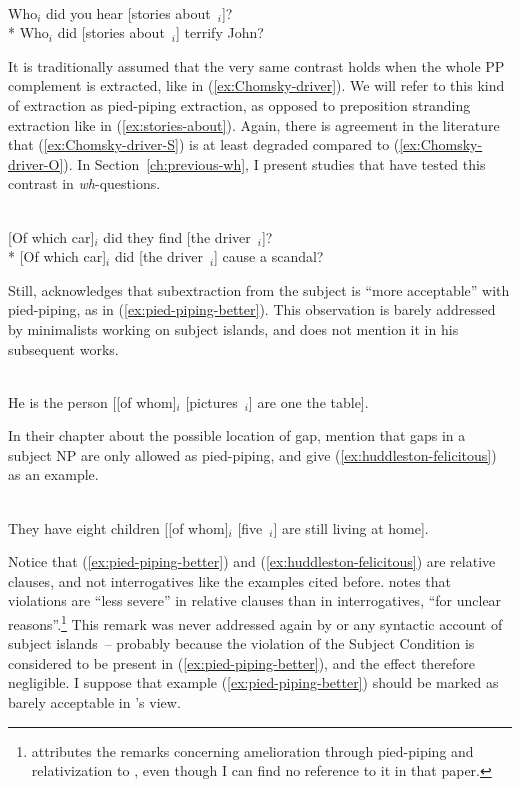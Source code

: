 \eal\label{ex:stories-about}
\ex \citep[248]{Chomsky.1973}\\
Who$_i$ did you hear [stories about~\trace{}$_i$]? \label{ex:stories-about-O}
\ex \citep[249]{Chomsky.1973}\\ \nopagebreak
 * Who$_i$ did [stories about~\trace{}$_i$] terrify John? \label{ex:stories-about-S}
\zl

It is traditionally assumed that the very same contrast holds when the whole PP complement is extracted, like in (\ref{ex:Chomsky-driver}). We will refer to this kind of extraction as pied-piping extraction, as opposed to preposition stranding extraction like in (\ref{ex:stories-about}). Again, there is agreement in the literature that (\ref{ex:Chomsky-driver-S}) is at least degraded compared to (\ref{ex:Chomsky-driver-O}). In Section~\ref{ch:previous-wh}, I present studies that have tested this contrast in \textit{wh}-questions.

\eal\label{ex:Chomsky-driver}
\ex \citep[147]{Chomsky.2008}\\
{ } [Of which car]$_i$ did they find [the driver~\trace{}$_i$]?
\label{ex:Chomsky-driver-O}
\ex \citep[153]{Chomsky.2008}\\
* [Of which car]$_i$ did [the driver~\trace{}$_i$] cause a scandal?
\label{ex:Chomsky-driver-S}
\zl 

Still, \citet[32]{Chomsky.1986} acknowledges that subextraction from the subject is ``more acceptable'' with pied-piping, as in (\ref{ex:pied-piping-better}). This observation is barely addressed by minimalists working on subject islands, and \citeauthor{Chomsky.1986} does not mention it in his subsequent works. 

\ea \citep[32]{Chomsky.1986}\\
He is the person [[of whom]$_i$ [pictures~\trace{}$_i$] are one the table].
\label{ex:pied-piping-better}
\z 

In their chapter about the possible location of gap, \citet[1093--1094]{Huddleston.2002} mention that gaps in a subject NP are only allowed as pied-piping, and give (\ref{ex:huddleston-felicitous}) as an example.

\ea \citep[1093]{Huddleston.2002}\\
They have eight children [[of whom]$_i$ [five~\trace{}$_i$] are still living at home]. 
\label{ex:huddleston-felicitous}
\z 

Notice that (\ref{ex:pied-piping-better}) and (\ref{ex:huddleston-felicitous}) are relative clauses, and not interrogatives like the examples cited before. \citet[32]{Chomsky.1986} notes that violations are ``less severe'' in relative clauses than in interrogatives, ``for unclear reasons''.\footnote{\citeauthor{Chomsky.1986} attributes the remarks concerning amelioration through pied-piping and relativization to \citet{Kuno.1972}, even though I can find no reference to it in that paper.} This remark was never addressed again by \citeauthor{Chomsky.1986} or any syntactic account of subject islands~-- probably because the violation of the Subject Condition is considered to be present in (\ref{ex:pied-piping-better}), and the effect therefore negligible. I suppose that example (\ref{ex:pied-piping-better}) should be marked as barely acceptable in \citeauthor{Chomsky.1986}'s view. 

